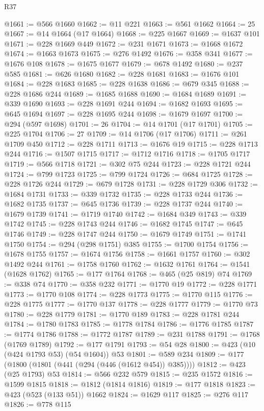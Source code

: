 \begin{lexlean}{R37}
\begin{coremodule}
@1661 := @566 @1660
@1662 := @11 @221
@1663 := @561 @1662
@1664 := 25
@1667 := @14 @1664 (@17 @1664)
@1668 := @225 @1667
@1669 := @1637 @101
@1671 := @228 @1669 @449
@1672 := @231 @1671
@1673 := @1668 @1672
@1674 := @1663 @1673
@1675 := @276 @1492
@1676 := @358 @341
@1677 := @1676 @108
@1678 := @1675 @1677
@1679 := @678 @1492
@1680 := @237 @585
@1681 := @626 @1680
@1682 := @228 @1681
@1683 := @1676 @101
@1684 := @228 @1683
@1685 := @228 @1638
@1686 := @679 @345
@1688 := @228 @1686 @244
@1689 := @1685 @1688
@1690 := @1684 @1689
@1691 := @339 @1690
@1693 := @228 @1691 @244
@1694 := @1682 @1693
@1695 := @645 @1694
@1697 := @228 @1695 @244
@1698 := @1679 @1697
@1700 := @294 (@597 @1698)
@1701 := 26
@1704 := @14 @1701 (@17 @1701)
@1705 := @225 @1704
@1706 := 27
@1709 := @14 @1706 (@17 @1706)
@1711 := @261 @1709 @450
@1712 := @228 @1711
@1713 := @1676 @19
@1715 := @228 @1713 @244
@1716 := @1507 @1715
@1717 := @1712 @1716
@1718 := @1705 @1717
@1719 := @566 @1718
@1721 := @302 @75 @244
@1723 := @228 @1721 @244
@1724 := @799 @1723
@1725 := @799 @1724
@1726 := @684 @1725
@1728 := @228 @1726 @244
@1729 := @679 @1728
@1731 := @228 @1729 @306
@1732 := @1684 @1731
@1733 := @339 @1732
@1735 := @228 @1733 @244
@1736 := @1682 @1735
@1737 := @645 @1736
@1739 := @228 @1737 @244
@1740 := @1679 @1739
@1741 := @1719 @1740
@1742 := @1684 @349
@1743 := @339 @1742
@1745 := @228 @1743 @244
@1746 := @1682 @1745
@1747 := @645 @1746
@1749 := @228 @1747 @244
@1750 := @1679 @1749
@1751 := @1741 @1750
@1754 := @294 (@298 @1751) @385
@1755 := @1700 @1754
@1756 := @1678 @1755
@1757 := @1674 @1756
@1758 := @1661 @1757
@1760 := @302 @1492 @244
@1761 := @1758 @1760
@1762 := @1632 @1761
@1764 := @1541 (@1628 @1762)
@1765 := @177 @1764
@1768 := @465 (@25 @819) @74
@1769 := @338 @74
@1770 := @358 @232
@1771 := @1770 @19
@1772 := @228 @1771
@1773 := @1770 @108
@1774 := @228 @1773
@1775 := @1770 @115
@1776 := @228 @1775
@1777 := @1770 @137
@1778 := @228 @1777
@1779 := @1770 @73
@1780 := @228 @1779
@1781 := @1770 @189
@1783 := @228 @1781 @244
@1784 := @1780 @1783
@1785 := @1778 @1784
@1786 := @1776 @1785
@1787 := @1774 @1786
@1788 := @1772 @1787
@1789 := @231 @1788
@1791 := @1768 (@1769 @1789)
@1792 := @177 @1791
@1793 := @54 @28
@1800 := @423 (@10 (@424 @1793 @53) (@54 @1604)) @53
@1801 := @589 @234
@1809 := @177 (@1800 (@1801 (@441 (@294 (@446 (@1612 @454)) @385))))
@1812 := @423 (@25 @1793) @53
@1814 := @566 @232 @579
@1815 := @235 @1572
@1816 := @1599 @1815
@1818 := @1812 (@1814 @1816)
@1819 := @177 @1818
@1823 := @423 (@523 (@133 @51)) @1662
@1824 := @1629 @117
@1825 := @276 @117
@1826 := @778 @115

\end{coremodule}
\end{lexlean}

